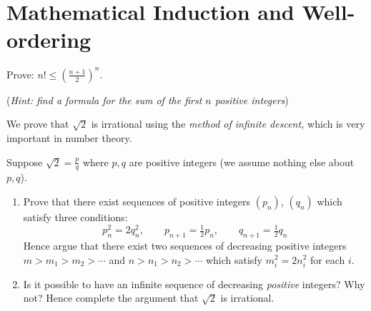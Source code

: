 \graphicspath{{notes/5induction/}}
\section{Mathematical Induction and Well-ordering}\label{chap:induction}

\iffalse
    \item Prove: $n! \le \left(\frac{n + 1}{2}\right)^n$.\par
     (\emph{Hint: find a formula for the sum of the first $n$ positive integers})
  
  \item We prove that $\sqrt 2$ is irrational using the \emph{method of infinite descent,} which is very important in number theory.\par
  Suppose $\sqrt 2=\frac pq$ where $p,q$ are positive integers (we assume nothing else about $p,q$).
  \begin{enumerate}
    \item Prove that there exist sequences of positive integers $(p_n)$, $(q_n)$ which satisfy three conditions:
    \[
    	p_n^2=2q_n^2,\qquad p_{n+1}=\tfrac 12p_n,\qquad q_{n+1}=\tfrac 12q_n
    \] 
    Hence argue that there exist two sequences of decreasing positive integers $m>m_1>m_2>\cdots$ and $n>n_1>n_2>\cdots$ which satisfy $m_i^2=2n_i^2$ for each $i$.
    
    \item Is it possible to have an infinite sequence of decreasing \emph{positive} integers? Why not? Hence complete the argument that $\sqrt 2$ is irrational.
	\end{enumerate}
  
%     


